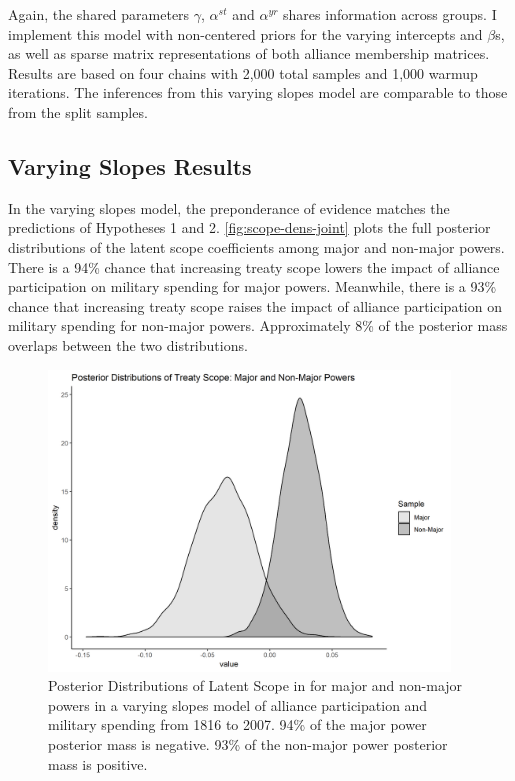\documentclass[12pt]{article}
\begin{document}
Again, the shared parameters $\gamma$, $\alpha^{st}$ and $\alpha^{yr}$ shares information across groups. 
I implement this model with non-centered priors for the varying intercepts and $\beta$s, as well as sparse matrix representations of both alliance membership matrices. 
Results are based on four chains with 2,000 total samples and 1,000 warmup iterations. 
The inferences from this varying slopes model are comparable to those from the split samples. 


\subsection{Varying Slopes Results}


In the varying slopes model, the preponderance of evidence matches the predictions of Hypotheses 1 and 2. 
\autoref{fig:scope-dens-joint} plots the full posterior distributions of the latent scope coefficients among major and non-major powers. 
There is a 94\% chance that increasing treaty scope lowers the impact of alliance participation on military spending for major powers. 
Meanwhile, there is a 93\% chance that increasing treaty scope raises the impact of alliance participation on military spending for non-major powers. 
Approximately 8\% of the posterior mass overlaps between the two distributions. 


\begin{figure}[htbp]
	\centering
		\includegraphics[width=0.95\textwidth]{scope-dens-joint.png}
	\caption{Posterior Distributions of Latent Scope in for major and non-major powers in a varying slopes model of alliance participation and military spending from 1816 to 2007. 94\% of the major power posterior mass is negative. 93\% of the non-major power posterior mass is positive.}
	\label{fig:scope-dens-joint}
\end{figure}
\end{document}
